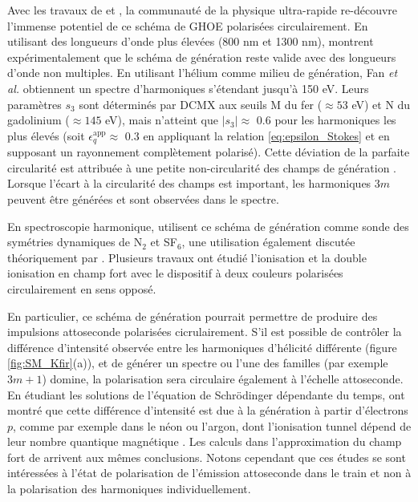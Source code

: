 Avec les travaux de  et , la communauté de la physique ultra-rapide re-découvre l'immense potentiel de ce schéma de GHOE polarisées circulairement. En utilisant des longueurs d'onde plus élevées (800 nm et 1300 nm),  montrent expérimentalement que le schéma de génération reste valide avec des longueurs d'onde non multiples. En utilisant l'hélium comme milieu de génération, Fan \textit{et al.} obtiennent un spectre d'harmoniques s'étendant jusqu'à 150 eV. Leurs paramètres $s_3$ sont déterminés par DCMX aux seuils M du fer ($\approx 53$ eV) et N du gadolinium ($\approx 145$ eV), mais n'atteint que $|s_3| \approx$ 0.6 pour les harmoniques les plus élevés (soit $\epsilon_{q}^{\text{app}} \approx$ 0.3 en appliquant la relation \ref{eq:epsilon_Stokes} et en supposant un rayonnement complètement polarisé). Cette déviation de la parfaite circularité est attribuée à une petite non-circularité des champs de génération . Lorsque l'écart à la circularité des champs est important, les harmoniques $3m$ peuvent être générées et sont observées dans le spectre.

En spectroscopie harmonique,  utilisent ce schéma de génération comme sonde des symétries dynamiques de N$_2$ et SF$_6$, une utilisation également discutée théoriquement par . Plusieurs travaux ont étudié l'ionisation  et la double ionisation  en champ fort avec le dispositif à deux couleurs polarisées circulairement en sens opposé.

En particulier, ce schéma de génération pourrait permettre de produire des impulsions attoseconde polarisées cicrulairement. S'il est possible de contrôler la différence d'intensité observée entre les harmoniques d'hélicité différente (figure \ref{fig:SM_Kfir}(a)), et de générer un spectre ou l'une des familles (par exemple $3m+1$) domine, la polarisation sera circulaire également à l'échelle attoseconde. En étudiant les solutions de l'équation de Schrödinger dépendante du temps,  ont montré que cette différence d'intensité est due à la génération à partir d'électrons $p$, comme par exemple dans le néon ou l'argon, dont l'ionisation tunnel dépend de leur nombre quantique magnétique . Les calculs dans l'approximation du champ fort de  arrivent aux mêmes conclusions. Notons cependant que ces études se sont intéressées à l'état de polarisation de l'émission attoseconde dans le train et non à la polarisation des harmoniques individuellement. 

